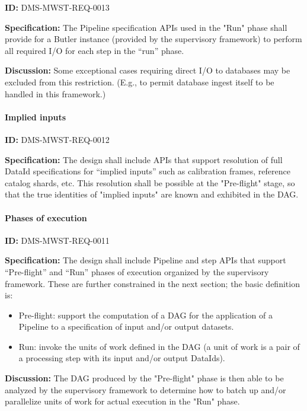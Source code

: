 \documentclass[SE,toc,lsstdraft]{lsstdoc}
\begin{document}
\label{DMS-MWST-REQ-0013}
\textbf{ID:} DMS-MWST-REQ-0013

\textbf{Specification:}
The Pipeline specification APIs used in the "Run" phase shall provide for a Butler instance (provided by the supervisory framework) to perform all required I/O for each step in the “run” phase.

\textbf{Discussion:}
Some exceptional cases requiring direct I/O to databases may be excluded from this restriction. (E.g., to permit database ingest itself to be handled in this framework.)

\paragraph{Implied inputs}\hfill  %

\label{DMS-MWST-REQ-0012}
\textbf{ID:} DMS-MWST-REQ-0012

\textbf{Specification:}
The design shall include APIs that support resolution of full DataId specifications for “implied inputs” such as calibration frames, reference catalog shards, etc. This resolution shall be possible at the "Pre-flight" stage, so that the true identities of "implied inputs" are known and exhibited in the DAG.

\paragraph{Phases of execution}\hfill  %

\label{DMS-MWST-REQ-0011}
\textbf{ID:} DMS-MWST-REQ-0011

\textbf{Specification:}
The design shall include Pipeline and step APIs that support “Pre-flight” and “Run” phases of execution organized by the supervisory framework. These are further constrained in the next section; the basic definition is:

    \begin{itemize}
\item
Pre-flight: support the computation of a DAG for the application of a Pipeline to a specification of input and/or output datasets.

\item
Run: invoke the units of work defined in the DAG (a unit of work is a pair of a processing step with its input and/or output DataIds).

    \end{itemize}

\textbf{Discussion:}
The DAG produced by the "Pre-flight" phase is then able to be analyzed by the supervisory framework to determine how to batch up and/or parallelize units of work for actual execution in the "Run" phase.
\end{document}

